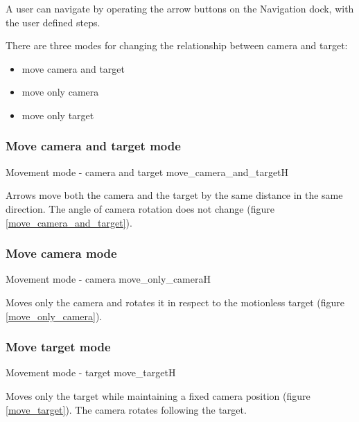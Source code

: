 A user can navigate by operating the arrow buttons on the Navigation dock, with the
user defined steps.

There are three modes for changing the relationship between camera and target:

\begin{multicols}{3}
\begin{itemize}
	\item move camera and target
	\item move only camera
	\item move only target
\end{itemize}
\end{multicols}

\subsubsection{Move camera and target mode}\label{move-camera-and-target-mode}

{Movement mode - camera and target}
{move_camera_and_target}{H}

Arrows move both the camera and the target by the same distance in the same direction. The angle of camera rotation does not change (figure \ref{move_camera_and_target}).

\subsubsection{Move camera mode}\label{move-camera-mode}

{Movement mode - camera}
{move_only_camera}{H}

Moves only the camera and rotates it in respect to the motionless target (figure \ref{move_only_camera}).

\subsubsection{Move target mode}\label{move-target-mode}

{Movement mode - target}
{move_target}{H}

Moves only the target while maintaining a fixed camera position (figure \ref{move_target}). The camera rotates following the target. 

